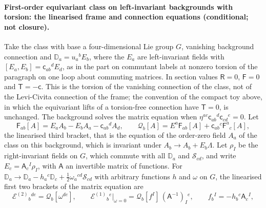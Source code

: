 \paragraph{First-order equivariant class on left-invariant backgrounds with torsion: the linearised frame and connection equations (conditional; not closure).}
Take the class with base a four-dimensional Lie group \(G\), vanishing background connection and \(\mathbb D_a=u_a{}^bE_b\), where the \(E_a\) are left-invariant fields with \([E_a,E_b]=\mathsf c_{ab}{}^dE_d\), as in the part on commutant labels at nonzero torsion of the paragraph on one loop about commuting matrices. In section values \(\mathsf R=0\), \(\mathsf F=0\) and \(\mathsf T=-\mathsf c\). This is the torsion of the vanishing connection of the class, not of the Levi-Civita connection of the frame; the convention of the compact toy above, in which the equivariant lifts of a torsion-free connection have \(\mathsf T=0\), is unchanged. The background solves the matrix equation when \(\eta^{ac}\mathsf c_{ab}{}^d\mathsf c_{cd}{}^e=0\). Let
\[
\mathsf F_{ab}[A]=E_aA_b-E_bA_a-\mathsf c_{ab}{}^dA_d,\qquad
\mathcal Q_b[A]=E^a\mathsf F_{ab}[A]+\mathsf c_{ab}{}^c\mathsf F^a{}_c[A],
\]
the linearised third bracket, that is the equation of the order-zero field \(A_a\) of the class on this background, which is invariant under \(A_b\to A_b+E_b\Lambda\). Let \(\rho_I\) be the right-invariant fields on \(G\), which commute with all \(\mathbb D_a\) and \(\mathcal S_{cd}\), and write \(E_c=\mathsf A_c{}^I\rho_I\), with \(\mathsf A\) an invertible matrix of functions. For \(\mathbb D_a\to\mathbb D_a-h_a{}^c\mathbb D_c+\tfrac12\omega_a{}^{cd}\mathcal S_{cd}\) with arbitrary functions \(h\) and \(\omega\) on \(G\), the linearised first two brackets of the matrix equation are
\[
\mathcal E^{(2)}{}_b{}^{de}=\mathcal Q_b[\omega^{de}],\qquad
\mathcal E^{(1)}{}_b{}^e\big|_{\omega=0}=\mathcal Q_b[f^I]\,(\mathsf A^{-1})_I{}^e,\qquad
f_b{}^I=-h_b{}^c\mathsf A_c{}^I,
\]

